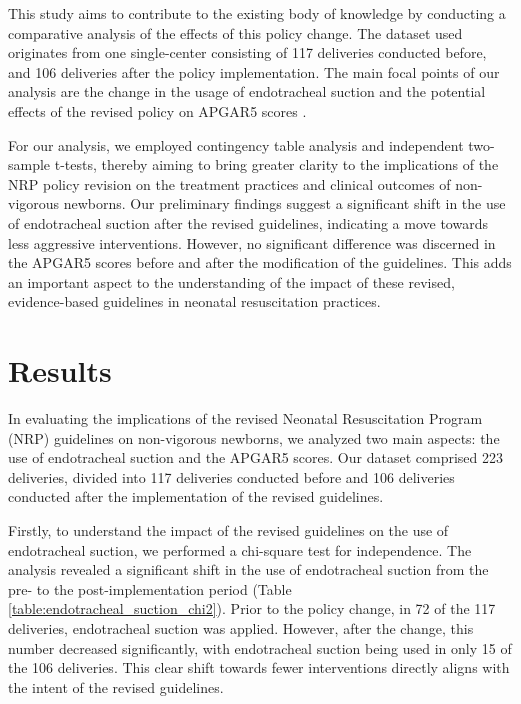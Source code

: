 \documentclass[11pt]{article}
\begin{document}
This study aims to contribute to the existing body of knowledge by conducting a comparative analysis of the effects of this policy change. The dataset used originates from one single-center consisting of 117 deliveries conducted before, and 106 deliveries after the policy implementation. The main focal points of our analysis are the change in the usage of endotracheal suction and the potential effects of the revised policy on APGAR5 scores \cite{Sariaslan2015DoesPD,Salmivaara2013UsingGD}.

For our analysis, we employed contingency table analysis and independent two-sample t-tests, thereby aiming to bring greater clarity to the implications of the NRP policy revision on the treatment practices and clinical outcomes of non-vigorous newborns. Our preliminary findings suggest a significant shift in the use of endotracheal suction after the revised guidelines, indicating a move towards less aggressive interventions. However, no significant difference was discerned in the APGAR5 scores before and after the modification of the guidelines. This adds an important aspect to the understanding of the impact of these revised, evidence-based guidelines in neonatal resuscitation practices.

\section*{Results}

In evaluating the implications of the revised Neonatal Resuscitation Program (NRP) guidelines on non-vigorous newborns, we analyzed two main aspects: the use of endotracheal suction and the APGAR5 scores. Our dataset comprised 223 deliveries, divided into 117 deliveries conducted before and 106 deliveries conducted after the implementation of the revised guidelines.

Firstly, to understand the impact of the revised guidelines on the use of endotracheal suction, we performed a chi-square test for independence. The analysis revealed a significant shift in the use of endotracheal suction from the pre- to the post-implementation period (Table \ref{table:endotracheal_suction_chi2}). Prior to the policy change, in 72 of the 117 deliveries, endotracheal suction was applied. However, after the change, this number decreased significantly, with endotracheal suction being used in only 15 of the 106 deliveries. This clear shift towards fewer interventions directly aligns with the intent of the revised guidelines.
\end{document}
